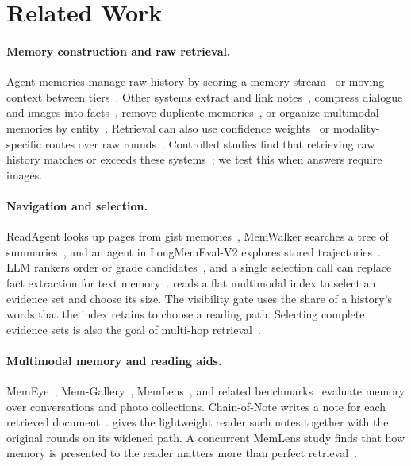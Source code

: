\section{Related Work}
\label{sec:related}

\paragraph{Memory construction and raw retrieval.} Agent memories manage raw history by scoring a memory stream~\citep{park2023generative} or moving context between tiers~\citep{packer2023memgpt}. Other systems extract and link notes~\citep{chhikara2025mem0,xu2025amem}, compress dialogue and images into facts~\citep{liu2026simplemem,liu2026omnisimplemem}, remove duplicate memories~\citep{chen2026telemem}, or organize multimodal memories by entity~\citep{long2025m3agent}. Retrieval can also use confidence weights~\citep{lu2026mma} or modality-specific routes over raw rounds~\citep{kang2026vmem}. Controlled studies find that retrieving raw history matches or exceeds these systems~\citep{bao2026rawrag,zhou2026explicit,peng2026memorytax}; we test this when answers require images.

\paragraph{Navigation and selection.} ReadAgent looks up pages from gist memories~\citep{lee2024readagent}, MemWalker searches a tree of summaries~\citep{chen2023memwalker}, and an agent in LongMemEval-V2 explores stored trajectories~\citep{wu2026lmev2}. LLM rankers order or grade candidates~\citep{sun2023rankgpt,zhuang2024beyond}, and a single selection call can replace fact extraction for text memory~\citep{sharma2026selection}. \vgs{} reads a flat multimodal index to select an evidence set and choose its size. The visibility gate uses the share of a history's words that the index retains to choose a reading path. Selecting complete evidence sets is also the goal of multi-hop retrieval~\citep{yang2018hotpotqa,gutierrez2024hipporag}.

\paragraph{Multimodal memory and reading aids.} MemEye~\citep{guo2026memeye}, Mem-Gallery~\citep{bei2026memgallery}, MemLens~\citep{ren2026memlens}, and related benchmarks~\citep{liu2026worldmemarena,chai2026smmbench,jiang2025memoryqa,nguyen2026personalvisual,nguyen2026camroll,tang2026dmvbench,guo2026seeingsurvey} evaluate memory over conversations and photo collections. Chain-of-Note writes a note for each retrieved document~\citep{yu2023chainofnote}. \vgs{} gives the lightweight reader such notes together with the original rounds on its widened path. A concurrent MemLens study finds that how memory is presented to the reader matters more than perfect retrieval~\citep{jiang2026delivery}.
